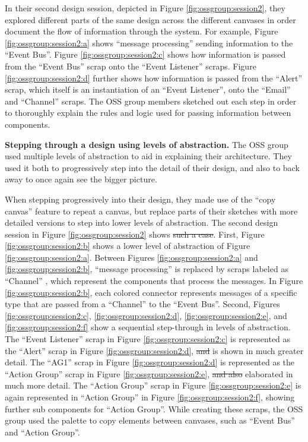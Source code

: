\documentclass[12pt,fleqn]{ucithesis}
\providecommand{\DIFaddtex}[1]{{\protect\color{blue}\uwave{#1}}} %
\providecommand{\DIFdeltex}[1]{{\protect\color{red}\sout{#1}}}                      %
\providecommand{\DIFaddbegin}{} %
\providecommand{\DIFaddend}{} %
\providecommand{\DIFdelbegin}{} %
\providecommand{\DIFdelend}{} %
\providecommand{\DIFadd}[1]{\texorpdfstring{\DIFaddtex{#1}}{#1}} %
\providecommand{\DIFdel}[1]{\texorpdfstring{\DIFdeltex{#1}}{}} %
\begin{document}
In their second design session, depicted in Figure \ref{fig:ossgroup:session2}, they explored different parts of the same design across the different canvases in order \DIFaddbegin \DIFadd{to }\DIFaddend document the flow of information through the system. For example, Figure \ref{fig:ossgroup:session2:a} shows ``message processing'' sending information to the ``Event Bus''. Figure \ref{fig:ossgroup:session2:c} shows how information is passed from the ``Event Bus'' scrap onto the ``Event Listener'' scraps. Figure \ref{fig:ossgroup:session2:d} further shows how information is passed from the ``Alert'' scrap, which itself is an instantiation of an ``Event Listener'', onto the ``Email'' and ``Channel'' scraps. The OSS group members sketched out each step in order to thoroughly explain the rules and logic used for passing information between components. 

\textbf{Stepping through a design using levels of abstraction. } The OSS group used multiple levels of abstraction to aid in explaining their architecture. They used it both to progressively step into the detail of their design, and also to back away to once again see the bigger picture.

When stepping progressively into their design, they made use of the ``copy canvas'' feature to repeat a canvas, but replace parts of their sketches with more detailed versions to step into lower levels of abstraction. The second design session in Figure \ref{fig:ossgroup:session2} shows \DIFdelbegin \DIFdel{such a case}\DIFdelend \DIFaddbegin \DIFadd{twp such cases}\DIFaddend . First, Figure \ref{fig:ossgroup:session2:b} shows a lower level of abstraction of Figure \ref{fig:ossgroup:session2:a}. Between Figures \ref{fig:ossgroup:session2:a} and \ref{fig:ossgroup:session2:b}, ``message processing'' is replaced by scraps labeled as ``Channel'' , which represent the components that process the messages.  In Figure \ref{fig:ossgroup:session2:b}, each colored connector represents messages of a specific type that are passed from a ``Channel'' to the ``Event Bus''. Second,  Figures \ref{fig:ossgroup:session2:c}, \ref{fig:ossgroup:session2:d}, \ref{fig:ossgroup:session2:e}, and \ref{fig:ossgroup:session2:f} show a sequential step-through in levels of abstraction. The ``Event Listener'' scrap in Figure \ref{fig:ossgroup:session2:c} is represented as the ``Alert'' scrap in Figure \ref{fig:ossgroup:session2:d}, \DIFdelbegin \DIFdel{and }\DIFdelend \DIFaddbegin \DIFadd{where it }\DIFaddend is shown in much greater detail. The ``AG1'' scrap in Figure \ref{fig:ossgroup:session2:d} is represented as the ``Action Group'' scrap in Figure \ref{fig:ossgroup:session2:e}, \DIFdelbegin \DIFdel{and also }\DIFdelend \DIFaddbegin \DIFadd{where it is }\DIFaddend elaborated in much more detail. The ``Action Group'' scrap in Figure \ref{fig:ossgroup:session2:e} is again represented in ``Action Group'' in Figure \ref{fig:ossgroup:session2:f}, showing further sub components for ``Action Group''. While creating these scraps, the OSS group used the palette to copy elements between canvases, such as ``Event Bus'' and ``Action Group''.
\end{document}
